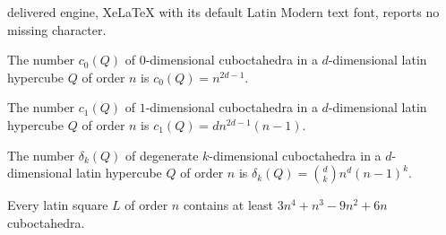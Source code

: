 \documentclass[10pt,a4paper]{amsart}
\begin{document}
delivered engine, XeLaTeX with its default Latin Modern text font, reports no missing character.
\begin{utv} \label{0dimcub}
The number $c_0 (Q)$ of $0$-dimensional cuboctahedra in a  $d$-dimensional latin hypercube $Q$ of order $n$ is $c_0(Q) = n^{2d - 1}$.
\end{utv}

\begin{utv} \label{1dimcub}
The number $c_1 (Q)$ of $1$-dimensional cuboctahedra in a  $d$-dimensional latin hypercube $Q$ of order $n$ is $c_1(Q) =  d n^{2d-1} (n-1)$.
\end{utv}

\begin{utv} \label{degenercub}
The number $\delta_k(Q)$ of degenerate $k$-dimensional cuboctahedra in a $d$-dimensional latin hypercube $Q$ of order $n$ is $\delta_k(Q) =  {d \choose k} n^{d} (n-1)^k$.
\end{utv}

\begin{theorem} \label{lowboundsquare}
Every latin square  $L$ of order $n$ contains at least $3 n^4 + n^3 - 9 n^2 + 6n$ cuboctahedra. 
\end{theorem}
\end{document}
